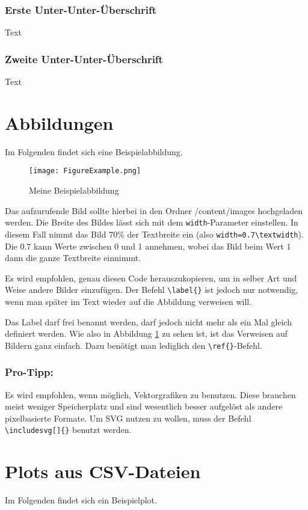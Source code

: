 \subsubsection{Erste Unter-Unter-Überschrift}
Text

\subsubsection{Zweite Unter-Unter-Überschrift}
Text


\section{Abbildungen}
Im Folgenden findet sich eine Beispielabbildung.

\begin{figure}[H]
    \centering
    \texttt{[image: FigureExample.png]}
    \caption{Meine Beispielabbildung}
    \label{fig:beispiel}
\end{figure}

Das aufzurufende Bild sollte hierbei in den Ordner /content/images hochgeladen werden. Die Breite des Bildes lässt sich mit dem \texttt{width}-Parameter einstellen. In diesem Fall nimmt das Bild 70\% der Textbreite ein (also \texttt{width=0.7\textbackslash{}textwidth}). Die 0.7 kann Werte zwischen 0 und 1 annehmen, wobei das Bild beim Wert 1 dann die ganze Textbreite einnimmt.

Es wird empfohlen, genau diesen Code herauszukopieren, um in selber Art und Weise andere Bilder einzufügen. Der Befehl \texttt{\textbackslash{}label\{\}} ist jedoch nur notwendig, wenn man später im Text wieder auf die Abbildung verweisen will.

Das Label darf frei benannt werden, darf jedoch nicht mehr als ein Mal gleich definiert werden. Wie also in Abbildung \ref{fig:beispiel} zu sehen ist, ist das Verweisen auf Bildern ganz einfach. Dazu benötigt man lediglich den \texttt{\textbackslash{}ref\{\}}-Befehl.

\subsubsection{Pro-Tipp:}
Es wird empfohlen, wenn möglich, Vektorgrafiken zu benutzen. Diese brauchen meist weniger Speicherplatz und sind wesentlich besser aufgelöst als andere pixelbasierte Formate. Um SVG nutzen zu wollen, muss der Befehl \texttt{\textbackslash{}includesvg[]\{\}} benutzt werden.

\section{Plots aus CSV-Dateien}
Im Folgenden findet sich ein Beispielplot.

